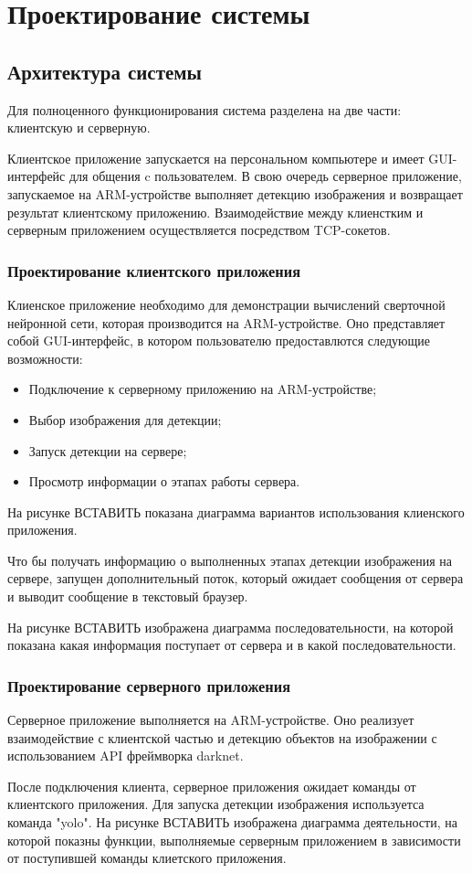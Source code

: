 \documentclass[a4paper,english,russian]{G2-105}
\begin{document}
\chapter{Проектирование системы}
\section{Архитектура системы}
\par Для полноценного функционирования система разделена на две части: клиентскую и серверную.
\par Клиентское приложение запускается на персональном компьютере и имеет GUI-интерфейс для общения c пользователем. В свою очередь серверное приложение, запускаемое на ARM-устройстве выполняет детекцию изображения и возвращает результат клиентскому приложению. Взаимодействие между клиенстким и серверным приложением осуществляется посредством TCP-сокетов.
\subsection{Проектирование клиентского приложения}
\par Клиенское приложение необходимо для демонстрации вычислений сверточной нейронной сети, которая производится на ARM-устройстве. Оно представляет собой GUI-интерфейс, в котором пользователю предоставлются следующие возможности:
\begin{itemize}
\item Подключение к серверному приложению на ARM-устройстве;
\item Выбор изображения для детекции;
\item Запуск детекции на сервере;
\item Просмотр информации о этапах работы сервера.
\end{itemize}
\par На рисунке ВСТАВИТЬ показана диаграмма вариантов использования клиенского приложения.
\par Что бы получать информацию о выполненных этапах детекции изображения на сервере, запущен дополнительный поток, который ожидает сообщения от сервера и выводит сообщение в текстовый браузер. 
\par На рисунке ВСТАВИТЬ изображена диаграмма последовательности, на которой показана какая информация поступает от сервера и в какой последовательности.
\subsection{Проектирование серверного приложения}
\par Серверное приложение выполняется на ARM-устройстве. Оно реализует взаимодействие с клиентской частью и детекцию объектов на изображении с использованием API фреймворка darknet.
\par После подключения клиента, серверное приложения ожидает команды от клиентского приложения. Для запуска детекции изображения используетса команда "yolo". На рисунке ВСТАВИТЬ изображена диаграмма деятельности, на которой показны функции, выполняемые серверным приложением в зависимости от поступившей команды клиетского приложения.
\end{document}
